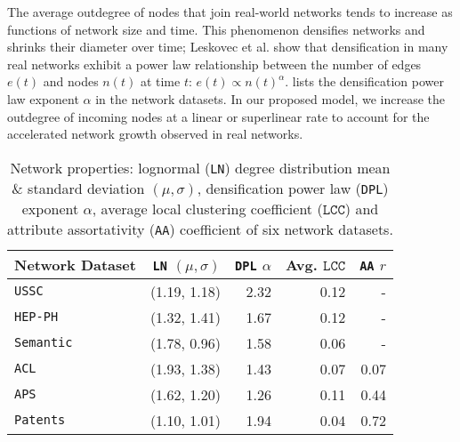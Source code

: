 The average outdegree of nodes that join real-world networks tends to increase
as functions of network size and time. This phenomenon densifies networks and shrinks their
diameter over time; Leskovec et al. \cite{leskovec2005graphs} show that
densification in many real networks exhibit a power law relationship between the
number of edges $e(t)$ and nodes $n(t)$ at time $t$: $e(t) \propto
n(t)^{\alpha}$.  lists the densification power law exponent $\alpha$ in
the network datasets. In our proposed model, we increase the outdegree of incoming nodes
at a linear or superlinear rate to account for the accelerated network growth
observed in real networks.
\begin{table}[!h]
 \center
 {
  \begin{tabular}[c]{lrrrr} \toprule
  Network Dataset &  \texttt{LN} $(\mu, \sigma)$ & \texttt{DPL} $\alpha$       &  Avg. ${\texttt{LCC}}$  & \texttt{AA} $r$   \\ \midrule
  \texttt{USSC}     &   (1.19, 1.18) & 2.32     & 0.12    & -     \\
  \texttt{HEP-PH}   &   (1.32, 1.41) & 1.67     & 0.12    & -     \\
  \texttt{Semantic} &   (1.78, 0.96)  & 1.58     & 0.06    & -     \\   \midrule
  \texttt{ACL}      &   (1.93, 1.38)  & 1.43     & 0.07    & 0.07     \\
  \texttt{APS}      &   (1.62, 1.20)  & 1.26     & 0.11    & 0.44     \\
  \texttt{Patents}  &   (1.10, 1.01)   & 1.94     & 0.04    & 0.72    \\
   \bottomrule
  \end{tabular}
  \vspace{1mm}
  \caption{Network properties: lognormal (\texttt{LN}) degree distribution mean \& standard deviation $(\mu, \sigma)$,
  densification power law (\texttt{DPL}) exponent $\alpha$, average local clustering coefficient (${\texttt{LCC}}$)
  and attribute assortativity (\texttt{AA}) coefficient of six network datasets.}
  \label{table:netstats}
 }
\end{table}

